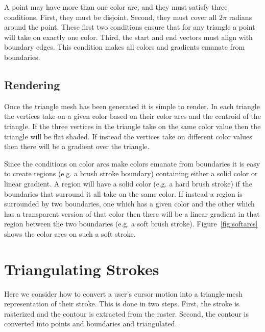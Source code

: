 \documentclass[review]{acmsiggraph}
\begin{document}
A point may have more than one color arc, and they must satisfy three conditions. First, they must be disjoint. Second,
they must cover all $2\pi$ radians around the point. These first two conditions ensure that for any
triangle a point will take on exactly one color. Third, the start and end vectors must align
with boundary edges. This condition makes all colors and gradients emanate from boundaries.

\subsection{Rendering}
Once the triangle mesh has been generated it is simple to render. In each triangle the vertices
take on a given color based on their color arcs and the centroid of the triangle. If the three
vertices in the triangle take on the same color value then the triangle will be flat shaded. If instead the 
vertices take on different color values then there will be a gradient over the triangle.

Since the conditions on color arcs make colors emanate from boundaries it is easy to create regions (e.g. a brush stroke boundary)
containing either a solid color or linear gradient. A region will have a solid color (e.g. a hard brush stroke) if the
boundaries that surround it all take on the same color. If instead a region is surrounded by
two boundaries, one which has a given color and the other which has a transparent version of that color
then there will be a linear gradient in that region between the two boundaries (e.g. a soft brush stroke).
Figure~\ref{fig:softarcs} shows the color arcs on such a soft stroke.


\section{Triangulating Strokes}

Here we consider how to convert a user's cursor motion into a triangle-mesh representation
of their stroke. This is done in two steps. First, the stroke is rasterized and the
contour is extracted from the raster. Second, the contour is converted into points and
boundaries and triangulated.
\end{document}
